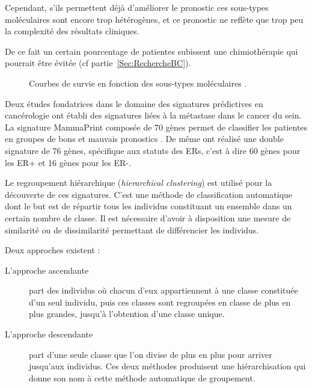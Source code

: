 
      Cependant, s'ils permettent déjà d'améliorer le pronostic ces sous-types moléculaires sont encore trop hétérogènes, et ce pronostic ne reflète que trop peu la complexité des résultats cliniques.

      De ce fait un certain pourcentage de patientes subissent une chimiothérapie qui pourrait être évitée \citep{Bertucci2002} (cf partie~\ref{Sec:RechercheBC}).

      \begin{figure}
        \centering
        \def\svgwidth{\columnwidth}
        
        \caption{Courbes de survie en fonction des sous-types moléculaires \citep{Perou2000,Sorlie2001,Hu2006}.}
        \label{fig:Subtypes-survival}
      \end{figure}

      Deux études fondatrices dans le domaine des signatures prédictives en cancérologie ont établi des signatures liées à la métastase dans le cancer du sein.
      La signature MammaPrint composée de 70 gènes permet de classifier les patientes en groupes de bons et mauvais pronostics \citep{vandevijver2002}.
      De même \citeauthor{Wang2005} ont réalisé une double signature de 76 gènes, spécifique aux statuts des \acp{ER}, c'est à dire 60 gènes pour les \acs{ER+} et 16 gènes pour les \acs{ER-}.

      Le regroupement hiérarchique (\emph{hierarchical clustering}) est utilisé pour la découverte de ces signatures.
      C'est une méthode de classification automatique dont le but est de répartir tous les individus constituant un ensemble dans un certain nombre de classe.
      Il est nécessaire d'avoir à disposition une mesure de similarité ou de dissimilarité permettant de différencier les individus.

      \pagebreak

      Deux approches existent :
      \begin{description}

      \item [L'approche ascendante]part des individus où chacun d'eux appartiennent à une classe constituée d'un seul individu, puis ces classes sont regroupées en classe de plus en plus grandes, jusqu'à l'obtention d'une classe unique.

      \item [L'approche descendante]part d'une seule classe que l'on divise de plus en plus pour arriver jusqu'aux individus.
      Ces deux méthodes produisent une hiérarchisation qui donne son nom à cette méthode automatique de groupement.
      \end{description}

